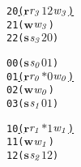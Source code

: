 \newsavebox{\boxthree}
\begin{lrbox}{\boxthree}
\begin{minipage}[t]{0.65\linewidth}
\large
\begin{alltt}
20 \underline{(\(\mathbf{r}\) \(\mathit{r\sb{3}}\) \(\mathit{1 2}\) \(\mathit{w\sb{3}}\))}
21 (\(\mathbf{w}\) \(\mathit{w\sb{3}}\))
22 (\(\mathbf{s}\) \(\mathit{s\sb{3}}\) \(\mathit{2 0}\))
\end{alltt}
\end{minipage}
\end{lrbox}


\newcommand\examplefigthree{
\begin{figure*}[tb]
\begin{center}
\setlength{\tabcolsep}{2pt}
\begin{tabular}[t]{c|c|c}
$p_0$ & $p_1$ & $p_2$ \\
\hline
\scalebox{0.8}{\usebox{\boxone}}&
\scalebox{0.8}{\usebox{\boxtwo}} &
\scalebox{0.8}{\usebox{\boxthree}}\\
\end{tabular}
\end{center}
\caption{A deadlock caused by circular dependency in messages.}
\label{fig:deadlock2}
\end{figure*}
}


\newsavebox{\boxoneno}
\begin{lrbox}{\boxoneno}
\begin{minipage}[t]{0.65\linewidth}
\large
\begin{alltt}
00 (\(\mathbf{s}\) \(\mathit{s\sb{0}}\) \(\mathit{0 1}\))
01 \underline{(\(\mathbf{r}\) \(\mathit{r\sb{0}}\) \(\mathit{\ast 0}\) \(\mathit{w\sb{0}}\))}
02 (\(\mathbf{w}\) \(\mathit{w\sb{0}}\))
03 (\(\mathbf{s}\) \(\mathit{s\sb{1}}\) \(\mathit{0 1}\))
\end{alltt}
\end{minipage}
\end{lrbox}

\newsavebox{\boxtwono}
\begin{lrbox}{\boxtwono}
\begin{minipage}[t]{0.65\linewidth}
\large
\begin{alltt}
10 \underline{(\(\mathbf{r}\) \(\mathit{r\sb{1}}\) \(\mathit{\ast 1}\) \(\mathit{w\sb{1}}\))}
11 (\(\mathbf{w}\) \(\mathit{w\sb{1}}\))
12 (\(\mathbf{s}\) \(\mathit{s\sb{2}}\) \(\mathit{1 2}\))
\end{alltt}
\end{minipage}
\end{lrbox}

